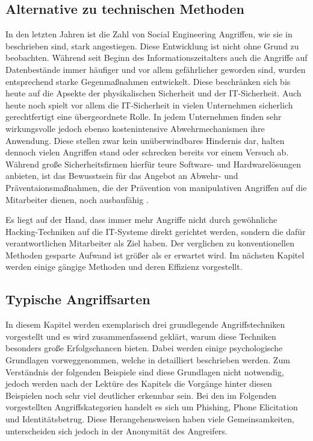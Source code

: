 \subsection{Alternative zu technischen Methoden}\label{sec:alternative_zu_technischen_methoden}
In den letzten Jahren ist die Zahl von Social Engineering Angriffen, wie sie in \citep{the-art-of-deception} beschrieben sind, stark angestiegen.
Diese Entwicklung ist nicht ohne Grund zu beobachten.
Während seit Beginn des Informationszeitalters auch die Angriffe auf Datenbestände immer häufiger und
vor allem gefährlicher geworden sind, wurden entsprechend starke Gegenmaßnahmen entwickelt.
Diese beschränken sich bis heute auf die Apsekte der physikalischen Sicherheit und der IT-Sicherheit.
Auch heute noch spielt vor allem die IT-Sicherheit in vielen Unternehmen sicherlich gerechtfertigt
eine übergeordnete Rolle.
In jedem Unternehmen finden sehr wirkungsvolle jedoch ebenso kostenintensive Abwehrmechanismen ihre Anwendung.
Diese stellen zwar kein unüberwindbares Hindernis dar, halten dennoch vielen Angriffen stand oder
schrecken bereits vor einem Versuch ab.
Während große Sicherheitsfirmen hierfür teure Software- und Hardwarelösungen anbieten, ist das Bewusstsein für das Angebot an Abwehr- und Präventaionsmaßnahmen, die der Prävention von manipulativen Angriffen auf
die Mitarbeiter dienen, noch ausbaufähig \citep{hacking-the-human}.

Es liegt auf der Hand, dass immer mehr Angriffe nicht durch gewöhnliche Hacking-Techniken auf die IT-Systeme direkt gerichtet werden, sondern die dafür verantwortlichen Mitarbeiter als Ziel haben.
Der verglichen zu konventionellen Methoden gesparte Aufwand ist größer als er erwartet wird.
Im nächsten Kapitel werden einige gängige Methoden und deren Effizienz vorgestellt.

\subsection{Typische Angriffsarten}\label{sec:gangige_angriffe}
In diesem Kapitel werden exemplarisch drei grundlegende Angriffstechniken vorgestellt und es wird zusammenfassend geklärt, warum diese Techniken besonders große Erfolgschancen bieten.
Dabei werden einige psychologische Grundlagen vorweggenommen, welche in  detailliert
beschrieben werden.
Zum Verständnis der folgenden Beispiele sind diese Grundlagen nicht notwendig, jedoch werden nach der
Lektüre des Kapitels  die Vorgänge hinter diesen Beispielen noch sehr viel deutlicher erkennbar sein.
Bei den im Folgenden vorgestellten Angriffskategorien handelt es sich um Phishing, Phone Elicitation und Identitätsbetrug. Diese Herangehensweisen haben viele Gemeinsamkeiten, unterscheiden sich jedoch in der Anonymität des Angreifers.

